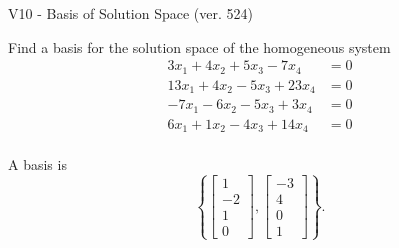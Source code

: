 \begin{exercise}
  \begin{exerciseTitle}V10 - Basis of Solution Space (ver. 524)\end{exerciseTitle}
  \begin{exerciseStatement}
    Find a basis for the solution space of the homogeneous system 
\begin{align*}
 3 x_ 1 + 4 x_ 2 + 5 x_ 3 -7 x_ 4 &= 0  \\ 
  13 x_ 1 + 4 x_ 2 -5 x_ 3 + 23 x_ 4 &= 0  \\ 
  -7 x_ 1 -6 x_ 2 -5 x_ 3 + 3 x_ 4 &= 0  \\ 
  6 x_ 1 + 1 x_ 2 -4 x_ 3 + 14 x_ 4 &= 0  \\ 
 \end{align*}


 
  \end{exerciseStatement}

  \begin{exerciseAnswer}
   A basis is   
\[\left\{\left[\begin{array}{c}
1 \\
-2 \\
1 \\
0
\end{array}\right] , \left[\begin{array}{c}
-3 \\
4 \\
0 \\
1
\end{array}\right]\right\}.\]

  


  \end{exerciseAnswer}
\end{exercise}